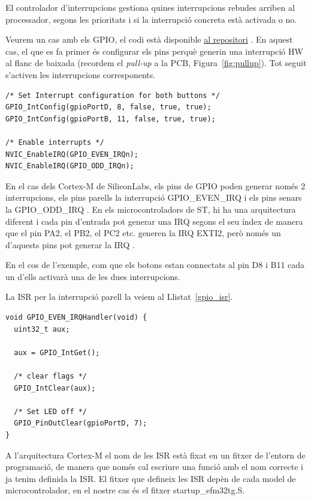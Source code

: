 El controlador d'interrupcions gestiona quines interrupcions rebudes arriben al processador, segons les prioritats i si la interrupció concreta està activada o no.

Veurem un cas amb els GPIO, el codi està disponible \href{https://github.com/mariusmm/cursembedded/tree/master/Simplicity/GPIO_2}{al repositori} . En aquest cas, el que es fa primer és configurar els pins perquè generin una interrupció HW al flanc de baixada (recordem el {\em pull-up} a la PCB, Figura~\ref{fig:pullup}). Tot seguit s'activen les interrupcions corresponents.
\begin{lstlisting}[style=customc]
 /* Set Interrupt configuration for both buttons */
GPIO_IntConfig(gpioPortD, 8, false, true, true);
GPIO_IntConfig(gpioPortB, 11, false, true, true);

/* Enable interrupts */
NVIC_EnableIRQ(GPIO_EVEN_IRQn);
NVIC_EnableIRQ(GPIO_ODD_IRQn);
\end{lstlisting}

En el cas dels Cortex-M de SiliconLabs, els pins de \gls{GPIO} poden generar només 2 interrupcions, els pins parells la interrupció GPIO\_EVEN\_IRQ i els pins senars la GPIO\_ODD\_IRQ \cite[405]{EFM32GRM}. En els microcontroladors de ST, hi ha una arquitectura diferent i cada pin d'entrada pot generar una IRQ segons el seu índex de manera que el pin PA2, el PB2, el PC2 etc. generen la IRQ EXTI2, però només un d'aquests pins pot generar la IRQ \cite[384]{STM32F4RM}.

En el cos de l'exemple, com que els botons estan connectats al pin D8 i B11 cada un d'ells activarà una de les dues interrupcions.

La \gls{ISR} per la interrupció parell la veiem al Llistat~\ref{gpio_isr}.
\begin{lstlisting}[style=customc, label=gpio_isr, caption=Exemple d'ISR per GPIO]
void GPIO_EVEN_IRQHandler(void) {
  uint32_t aux;

  aux = GPIO_IntGet();

  /* clear flags */
  GPIO_IntClear(aux);

  /* Set LED off */
  GPIO_PinOutClear(gpioPortD, 7);
}
\end{lstlisting}

A l'arquitectura Cortex-M el nom de les ISR està fixat en un fitxer de l'entorn de programació, de manera que només cal escriure una funció amb el nom correcte i ja tenim definida la ISR. El fitxer que defineix les ISR depèn de cada model de microcontrolador, en el nostre cas és el fitxer startup\_efm32tg.S.

